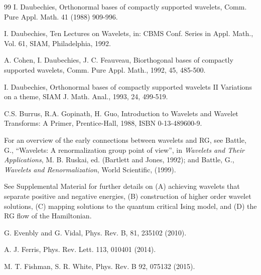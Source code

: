 \documentclass[aps,prl,twocolumn,showpacs,superscriptaddress,floatfix,10pt]{revtex4-1}
\begin{document}
\begin{thebibliography}{99}
I. Daubechies, 
Orthonormal bases of compactly supported wavelets, 
Comm. Pure Appl. Math. 41 (1988) 909-996.

I. Daubechies, 
Ten Lectures on Wavelets, 
in: CBMS Conf. Series in Appl. Math., Vol. 61, SIAM, Philadelphia, 1992. 

A. Cohen, I. Daubechies, J. C. Feauveau, 
Biorthogonal bases of compactly supported wavelets, 
Comm. Pure Appl. Math., 1992, 45, 485-500.

I. Daubechies, 
Orthonormal bases of compactly supported wavelets II Variations on a theme,  
SIAM J. Math. Anal., 1993, 24, 499-519.

C.S. Burrus, R.A. Gopinath, H. Guo, 
Introduction to Wavelets and Wavelet Transforms: A Primer, 
Prentice-Hall, 1988, ISBN 0-13-489600-9.

 For an overview of the early connections between wavelets and RG, see 
Battle, G., ``Wavelets: A renormalization group point of view'', in
{\it Wavelets and Their Applications}, M. B. Ruskai, ed. (Bartlett and Jones, 1992);
and Battle, G., {\it Wavelets and Renormalization}, World Scientific, (1999).

 See Supplemental Material for further details on (A) achieving
wavelets that separate positive and negative energies, (B) construction of
higher order wavelet solutions, (C) mapping solutions to the quantum
critical Ising model, and (D) the RG flow of the Hamiltonian.  





G. Evenbly and G. Vidal, 
Phys. Rev. B, 81, 235102 (2010).

A. J. Ferris, 
Phys. Rev. Lett. 113, 010401 (2014). %

M. T. Fishman, S. R. White, 
Phys. Rev. B 92, 075132 (2015). %


\end{thebibliography}
\end{document}
